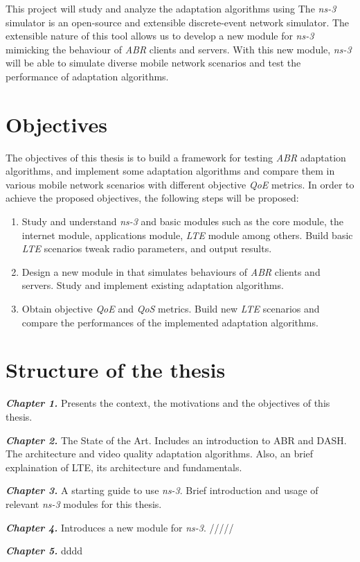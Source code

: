 This project will study and analyze the adaptation algorithms using \textit{}
The \textit{ns-3} simulator is an open-source and extensible discrete-event network simulator. 
The extensible nature of this tool allows us to develop a new module for \textit{ns-3}
mimicking the behaviour of \textit{ABR} clients and servers. With this new module, \textit{ns-3} 
will be able to simulate diverse mobile network scenarios and test the performance of adaptation algorithms.



\section{Objectives}
\label{sec:objectives}
The objectives of this thesis is to build a framework for testing \textit{ABR} adaptation
algorithms, and implement some adaptation algorithms and compare them in 
various mobile network scenarios with different objective \textit{QoE} metrics. 
In order to achieve the proposed objectives, the following steps will be proposed:

\begin{enumerate}
  \item Study and understand \textit{ns-3} and basic modules such as the core module, the
  internet module, applications module, \textit{LTE} module among others. Build basic \textit{LTE} scenarios
  tweak radio parameters, and output results.
  \item Design a new module in  that simulates behaviours of \textit{ABR} clients
  and servers. Study and implement existing adaptation algorithms.
  \item Obtain objective \textit{QoE} and \textit{QoS} metrics.
  Build new \textit{LTE} scenarios and compare the performances of the implemented adaptation
  algorithms.
\end{enumerate}


\section{Structure of the thesis}
\label{sec:structure}


\textbf{\textit{Chapter 1.}} Presents the context, the motivations and the objectives of this thesis.

\textbf{\textit{Chapter 2.}} The State of the Art. Includes an introduction to ABR and DASH. The architecture
and video quality adaptation algorithms. Also, an brief explaination of LTE, its architecture and fundamentals.

\textbf{\textit{Chapter 3.}} A starting guide to use \textit{ns-3}. Brief introduction and usage of 
relevant \textit{ns-3} modules for this thesis.

\textbf{\textit{Chapter 4.}} Introduces a new module for \textit{ns-3}. /////

\textbf{\textit{Chapter 5.}} dddd
